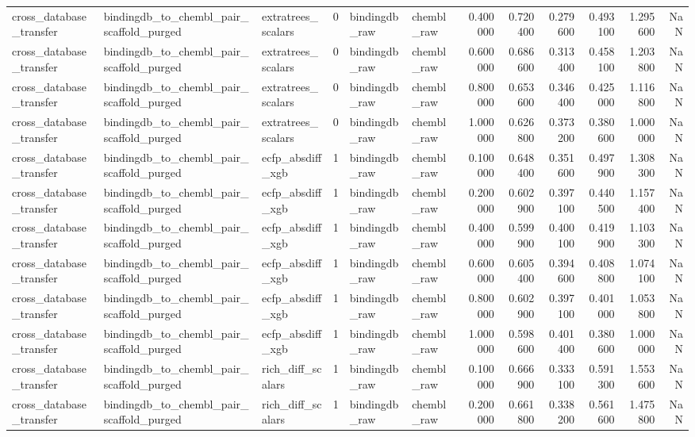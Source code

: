\begin{longtable}{lllrllrrrrrr}
cross\_database\_transfer & bindingdb\_to\_chembl\_pair\_scaffold\_purged & extratrees\_scalars & 0 & bindingdb\_raw & chembl\_raw & 0.400000 & 0.720400 & 0.279600 & 0.493100 & 1.295600 & NaN \\
cross\_database\_transfer & bindingdb\_to\_chembl\_pair\_scaffold\_purged & extratrees\_scalars & 0 & bindingdb\_raw & chembl\_raw & 0.600000 & 0.686600 & 0.313400 & 0.458100 & 1.203800 & NaN \\
cross\_database\_transfer & bindingdb\_to\_chembl\_pair\_scaffold\_purged & extratrees\_scalars & 0 & bindingdb\_raw & chembl\_raw & 0.800000 & 0.653600 & 0.346400 & 0.425000 & 1.116800 & NaN \\
cross\_database\_transfer & bindingdb\_to\_chembl\_pair\_scaffold\_purged & extratrees\_scalars & 0 & bindingdb\_raw & chembl\_raw & 1.000000 & 0.626800 & 0.373200 & 0.380600 & 1.000000 & NaN \\
cross\_database\_transfer & bindingdb\_to\_chembl\_pair\_scaffold\_purged & ecfp\_absdiff\_xgb & 1 & bindingdb\_raw & chembl\_raw & 0.100000 & 0.648400 & 0.351600 & 0.497900 & 1.308300 & NaN \\
cross\_database\_transfer & bindingdb\_to\_chembl\_pair\_scaffold\_purged & ecfp\_absdiff\_xgb & 1 & bindingdb\_raw & chembl\_raw & 0.200000 & 0.602900 & 0.397100 & 0.440500 & 1.157400 & NaN \\
cross\_database\_transfer & bindingdb\_to\_chembl\_pair\_scaffold\_purged & ecfp\_absdiff\_xgb & 1 & bindingdb\_raw & chembl\_raw & 0.400000 & 0.599900 & 0.400100 & 0.419900 & 1.103300 & NaN \\
cross\_database\_transfer & bindingdb\_to\_chembl\_pair\_scaffold\_purged & ecfp\_absdiff\_xgb & 1 & bindingdb\_raw & chembl\_raw & 0.600000 & 0.605400 & 0.394600 & 0.408800 & 1.074100 & NaN \\
cross\_database\_transfer & bindingdb\_to\_chembl\_pair\_scaffold\_purged & ecfp\_absdiff\_xgb & 1 & bindingdb\_raw & chembl\_raw & 0.800000 & 0.602900 & 0.397100 & 0.401000 & 1.053800 & NaN \\
cross\_database\_transfer & bindingdb\_to\_chembl\_pair\_scaffold\_purged & ecfp\_absdiff\_xgb & 1 & bindingdb\_raw & chembl\_raw & 1.000000 & 0.598600 & 0.401400 & 0.380600 & 1.000000 & NaN \\
cross\_database\_transfer & bindingdb\_to\_chembl\_pair\_scaffold\_purged & rich\_diff\_scalars & 1 & bindingdb\_raw & chembl\_raw & 0.100000 & 0.666900 & 0.333100 & 0.591300 & 1.553600 & NaN \\
cross\_database\_transfer & bindingdb\_to\_chembl\_pair\_scaffold\_purged & rich\_diff\_scalars & 1 & bindingdb\_raw & chembl\_raw & 0.200000 & 0.661800 & 0.338200 & 0.561600 & 1.475800 & NaN \\

\end{longtable}
